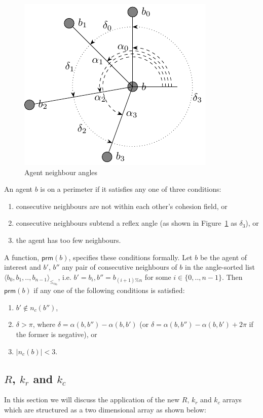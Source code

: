 \documentclass[12pt,a4paper]{IEEEtran}
\newcommand{\card}[1]{\vert{#1}\vert}
\newcommand{\pangle}{\mathit{\alpha}}
\newcommand{\leqaz}[3]{#2 \leq_{\pangle_#1} #3}
\newcommand{\angleordered}[2]{\langle #2 \rangle_{\leqaz{#1}{}{}}}
\newcommand{\prm}{\mathsf{prm}}
\newcommand{\kc}{\mathit{k_c}}
\newcommand{\kr}{\mathit{k_r}}
\newcommand{\rb}{\mathit{R}}
\begin{document}
\begin{figure}[H]
	\centering
	\includegraphics[width=0.8\linewidth]{figures/neighbours3}
	\caption[Agent neighbours]{Agent neighbour angles}
	\label{fig:neighbours3}
\end{figure}

An agent $b$ is on a perimeter if it satisfies any one of three conditions:
\begin{enumerate}
	\item consecutive neighbours are not within each other's cohesion field, or
	\item consecutive neighbours subtend a reflex angle (as shown in Figure~\ref{fig:neighbours3} as $\delta_3$), or
	\item the agent has too few neighbours.
\end{enumerate}
A function, $\prm(b)$, specifies these conditions formally. Let $b$ be the
agent of interest and $b'$, $b''$ any pair of consecutive neighbours of $b$ in
the angle-sorted list $\angleordered{b}{b_0, b_1, .., b_{n-1}}$, i.e. $b' =
b_i, b'' = b_{(i+1)\%n}$ for some $i \in \{0,..,n-1\}$.  Then $\prm(b)$ if any
one of the following conditions is satisfied:
\begin{enumerate}
\item $b' \notin n_c(b'')$,
\item $\delta > \pi$, where $\delta = \pangle(b, b'') - \pangle(b, b')$ (or $\delta = \pangle(b, b'') - \pangle(b, b') + 2\pi$ if the former is negative), or
\item $\card{n_c(b)} < 3$.
\end{enumerate}

\subsection{$\rb$, $\kr$ and $\kc$}\label{sec:rbkrkc} 
In this section we will discuss the application of the new $\rb$, $\kr$ and $\kc$ arrays which are structured as a two dimensional array as shown below:
\end{document}
